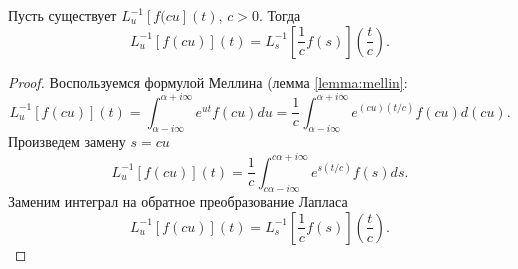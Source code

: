 \documentclass[../paper.tex]{subfiles}
\begin{document}
\begin{Lem}
\label{laplace-var-change}
Пусть существует $L^{-1}_u [f(cu](t)$, $c>0$.
Тогда
\[
    L^{-1}_u \left[ f(cu) \right](t) = L^{-1}_s \left[ \frac{1}{c}f(s) \right]\left(\frac{t}{c}\right)
.\]
\end{Lem}
\begin{proof}
Воспользуемся формулой Меллина (лемма \ref{lemma:mellin}:
\[
	L^{-1}_u\left[f\left(cu\right)\right](t) 
	= \int_{\alpha-i\infty}^{\alpha+i\infty} e^{ut}f(cu)du 
	= \frac{1}{c} \int_{\alpha-i\infty}^{\alpha+i\infty} e^{\left(cu\right) (t/c)} f(cu) d\left(cu\right)
.\]
Произведем замену $s=cu$
\[
	L^{-1}_u\left[f\left(cu\right)\right](t)
	= \frac{1}{c} \int_{c\alpha-i\infty}^{c\alpha+i\infty} e^{s (t/c)} f(s) ds
.\]
Заменим интеграл на обратное преобразование Лапласа
\[
	L^{-1}_u\left[f\left(cu\right)\right](t)
	= L^{-1}_s \left[ \frac{1}{c} f(s) \right]\left( \frac{t}{c} \right)  
.\]
\end{proof}
\end{document}
